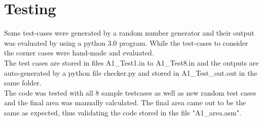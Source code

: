 \documentclass{article} %
\begin{document}
\section{Testing}
Some test-cases were generated by a random number generator and their output was evaluated by using a python 3.0 program. While the test-cases to consider the corner cases were hand-made and evaluated.
\\The test cases are stored in files A1\_Test1.in to A1\_Test8.in and the outputs are auto-generated by a python file checker.py and stored in A1\_Test\_out.out in the same folder.
\\The code was tested with all 8 sample testcases as well as new random test cases and the final area was manually calculated. The final area came out to be the same as expected, thus validating the code stored in the file "A1\_area.asm".
\end{document}
